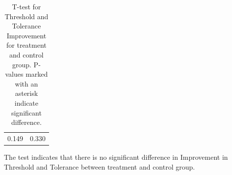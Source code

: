 \begin{longtable} {c|c}
	\caption{T-test for Threshold and Tolerance Improvement for treatment and control group. P-values marked with an asterisk indicate significant difference.}	\label{tab:T-test1} \\
 \cellcolor[HTML]{C0C0C0}{\textbf{Threshold}} &  \cellcolor[HTML]{C0C0C0}{\textbf{Tolerance}}	\\ \hline
0.149 & 0.330  \\ \hline
\end{longtable}
\vspace{-.5cm}

The test indicates that there is no significant difference in Improvement in Threshold and Tolerance between treatment and control group.


%
%
%
% 



